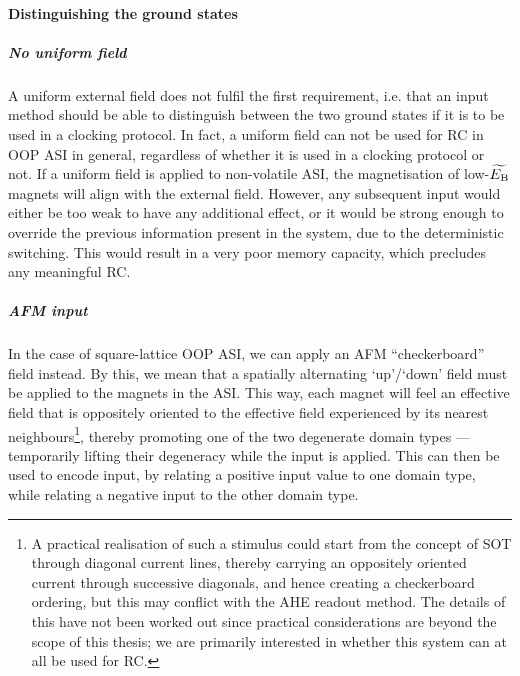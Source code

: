 
\paragraph{Distinguishing the ground states}
\subparagraph{No uniform field}
A uniform external field does not fulfil the first requirement, i.e. that an input method should be able to distinguish between the two ground states if it is to be used in a clocking protocol.
In fact, a uniform field can not be used for RC in OOP ASI in general, regardless of whether it is used in a clocking protocol or not.
If a uniform field is applied to non-volatile ASI, the magnetisation of low-$\widetilde{E_\mathrm{B}}$ magnets will align with the external field.
However, any subsequent input would either be too weak to have any additional effect, or it would be strong enough to override the previous information present in the system, due to the deterministic switching.
This would result in a very poor memory capacity, which precludes any meaningful RC.

\subparagraph{AFM input}
In the case of square-lattice OOP ASI, we can apply an AFM ``checkerboard'' field instead.
By this, we mean that a spatially alternating `up'/`down' field must be applied to the magnets in the ASI.
This way, each magnet will feel an effective field that is oppositely oriented to the effective field experienced by its nearest neighbours\footnote{
	A practical realisation of such a stimulus could start from the concept of SOT through diagonal current lines, thereby carrying an oppositely oriented current through successive diagonals, and hence creating a checkerboard ordering, but this may conflict with the AHE readout method.
	The details of this have not been worked out since practical considerations are beyond the scope of this thesis; we are primarily interested in whether this system can at all be used for RC.
}, thereby promoting one of the two degenerate domain types --- temporarily lifting their degeneracy while the input is applied.
This can then be used to encode input, by relating a positive input value to one domain type, while relating a negative input to the other domain type.


